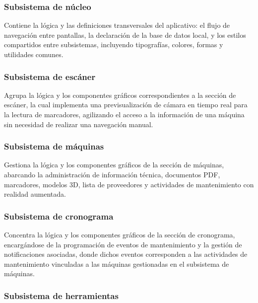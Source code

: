 
        \subsubsection{Subsistema de núcleo}

            Contiene la lógica y las definiciones transversales del aplicativo: el flujo de navegación entre pantallas, la declaración de la base de datos local, y los estilos compartidos entre subsistemas, incluyendo tipografías, colores, formas y utilidades comunes.

        \subsubsection{Subsistema de escáner}

            Agrupa la lógica y los componentes gráficos correspondientes a la sección de escáner, la cual implementa una previsualización de cámara en tiempo real para la lectura de marcadores, agilizando el acceso a la información de una máquina sin necesidad de realizar una navegación manual.

        \subsubsection{Subsistema de máquinas}

            Gestiona la lógica y los componentes gráficos de la sección de máquinas, abarcando la administración de información técnica, documentos PDF, marcadores, modelos 3D, lista de proveedores y actividades de mantenimiento con realidad aumentada.

        \subsubsection{Subsistema de cronograma}

            Concentra la lógica y los componentes gráficos de la sección de cronograma, encargándose de la programación de eventos de mantenimiento y la gestión de notificaciones asociadas, donde dichos eventos corresponden a las actividades de mantenimiento vinculadas a las máquinas gestionadas en el subsistema de máquinas.

        \subsubsection{Subsistema de herramientas}

